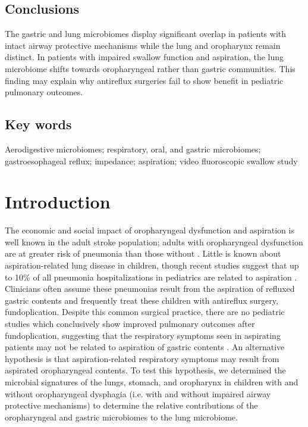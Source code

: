 \subsection{Conclusions}

The gastric and lung microbiomes display significant overlap in patients with intact airway protective mechanisms while the lung and oropharynx remain distinct.
In patients with impaired swallow function and aspiration, the lung microbiome shifts towards oropharyngeal rather than gastric communities.
This finding may explain why antireflux surgeries fail to show benefit in pediatric pulmonary outcomes.

\subsection{Key words}

Aerodigestive microbiomes; respiratory, oral, and gastric microbiomes; gastroesophageal reflux; impedance; aspiration; video fluoroscopic swallow study

\section{Introduction}



The economic and social impact of oropharyngeal dysfunction and aspiration is well known in the adult stroke population; adults with oropharyngeal dysfunction are at greater risk of pneumonia than those without \cite{holas1994aspcomplications}.
Little is known about aspiration-related lung disease in children, though recent studies suggest that up to 10\% of all pneumonia hospitalizations in pediatrics are related to aspiration \cite{thomson2016asppneumo}.
Clinicians often assume these pneumonias result from the aspiration of refluxed gastric contents and frequently treat these children with antireflux surgery, fundoplication.
Despite this common surgical practice, there are no pediatric studies which conclusively show improved pulmonary outcomes after fundoplication, suggesting that the respiratory symptoms seen in aspirating patients may not be related to aspiration of gastric contents \cite{barnhart2013fundo,lee2008fundo,goldin2006fundo,yeh2016,srivastava2009fundo}.
An alternative hypothesis is that aspiration-related respiratory symptoms may result from aspirated oropharyngeal contents.
To test this hypothesis, we determined the microbial signatures of the lungs, stomach, and oropharynx in children with and without oropharyngeal dysphagia (i.e. with and without impaired airway protective mechanisms) to determine the relative contributions of the oropharyngeal and gastric microbiomes to the lung microbiome.

